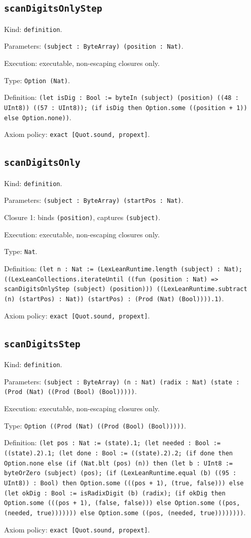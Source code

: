 \documentclass[11pt]{article}
\begin{document}
\subsection*{\texttt{scanDigitsOnlyStep}}
\noindent Kind: \texttt{definition}.\par
\noindent Parameters: \texttt{(subject : ByteArray) (position : Nat)}.\par
\noindent Execution: executable, non-escaping closures only.\par
\noindent Type: \texttt{Option (Nat)}.\par
\noindent Definition: \texttt{(let isDig : Bool := byteIn (subject) (position) ((48 : UInt8)) ((57 : UInt8)); (if isDig then Option.some ((position + 1)) else Option.none))}.\par
\noindent Axiom policy: \texttt{exact [Quot.sound, propext]}.\par
\subsection*{\texttt{scanDigitsOnly}}
\noindent Kind: \texttt{definition}.\par
\noindent Parameters: \texttt{(subject : ByteArray) (startPos : Nat)}.\par
\noindent Closure 1: binds \texttt{(position)}, captures \texttt{(subject)}.\par
\noindent Execution: executable, non-escaping closures only.\par
\noindent Type: \texttt{Nat}.\par
\noindent Definition: \texttt{(let n : Nat := (LexLeanRuntime.length (subject) : Nat); ((LexLeanCollections.iterateUntil ((fun (position : Nat) => scanDigitsOnlyStep (subject) (position))) ((LexLeanRuntime.subtract (n) (startPos) : Nat)) (startPos) : (Prod (Nat) (Bool)))).1)}.\par
\noindent Axiom policy: \texttt{exact [Quot.sound, propext]}.\par
\subsection*{\texttt{scanDigitsStep}}
\noindent Kind: \texttt{definition}.\par
\noindent Parameters: \texttt{(subject : ByteArray) (n : Nat) (radix : Nat) (state : (Prod (Nat) ((Prod (Bool) (Bool)))))}.\par
\noindent Execution: executable, non-escaping closures only.\par
\noindent Type: \texttt{Option ((Prod (Nat) ((Prod (Bool) (Bool)))))}.\par
\noindent Definition: \texttt{(let pos : Nat := (state).1; (let needed : Bool := ((state).2).1; (let done : Bool := ((state).2).2; (if done then Option.none else (if (Nat.blt (pos) (n)) then (let b : UInt8 := byteOrZero (subject) (pos); (if (LexLeanRuntime.equal (b) ((95 : UInt8)) : Bool) then Option.some (((pos + 1), (true, false))) else (let okDig : Bool := isRadixDigit (b) (radix); (if okDig then Option.some (((pos + 1), (false, false))) else Option.some ((pos, (needed, true))))))) else Option.some ((pos, (needed, true))))))))}.\par
\noindent Axiom policy: \texttt{exact [Quot.sound, propext]}.\par
\end{document}
